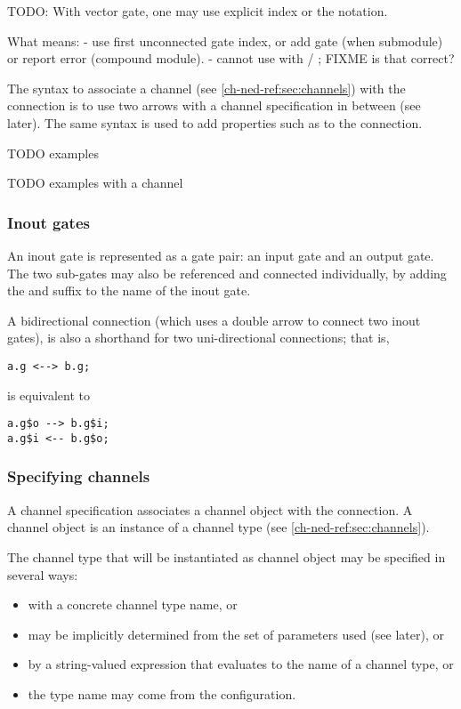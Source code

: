 TODO:
With vector gate, one may use explicit index or the  notation.

What \ttt{++} means:
 - use first unconnected gate index, or add gate (when submodule) or report error (compound module).
 - cannot use \ttt{++} with  / ; FIXME is that correct?

The syntax to associate a channel (see \ref{ch-ned-ref:sec:channels})
with the connection is to use two arrows with a channel specification
in between (see later). The same syntax is used to add properties such as
 to the connection.

TODO examples

TODO examples with a channel


\subsubsection{Inout gates}

An inout gate is represented as a gate pair: an input gate and an output gate.
The two sub-gates may also be referenced and connected individually, by adding
the  and  suffix to the name of the inout gate.

A bidirectional connection (which uses a double arrow to connect two inout gates),
is also a shorthand for two uni-directional connections; that is,

\begin{verbatim}
a.g <--> b.g;
\end{verbatim}

is equivalent to
\begin{verbatim}
a.g$o --> b.g$i;
a.g$i <-- b.g$o;
\end{verbatim}


\subsubsection{Specifying channels}

A channel specification associates a channel object with the connection.
A channel object is an instance of a channel type (see \ref{ch-ned-ref:sec:channels}).

The channel type that will be instantiated as channel object may be specified
in several ways:

\begin{itemize}
  \item with a concrete channel type name, or
  \item may be implicitly determined from the set of parameters used (see later), or
  \item by a string-valued expression that evaluates to the name of a
        channel type, or
  \item the type name may come from the configuration.
\end{itemize}

